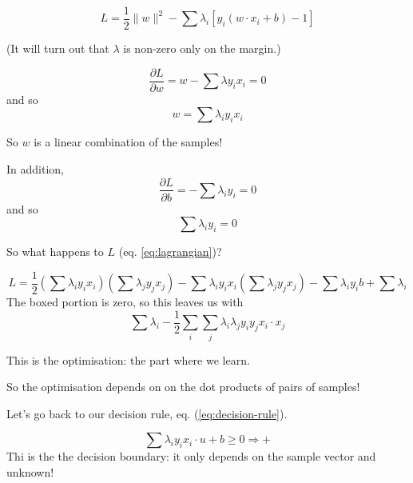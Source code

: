\begin{equation}
  \label{eq:lagrangian}
  L = \frac 12 \parallel w\parallel^2 - \sum \lambda_i \left[ y_i(w\cdot
    x_i + b) - 1 \right]
\end{equation}

(It will turn out that $\lambda$ is non-zero only on the margin.)

\begin{displaymath}
  \frac{\partial L}{\partial w} = w - \sum\lambda y_i x_i = 0
\end{displaymath}
and so
\begin{equation}
  \label{eq:w}
  w = \sum\lambda_i y_i x_i
\end{equation}

So $w$ is a linear combination of the samples!

In addition,
\begin{displaymath}
  \frac{\partial L}{\partial b} = -\sum \lambda_i y_i = 0
\end{displaymath}
and so
\begin{equation}
  \label{eq:b}
  \sum \lambda_i y_i = 0
\end{equation}

So what happens to $L$ (eq. \ref{eq:lagrangian})?

\bigskip

\begin{equation}
  \label{eq:learning-rule}
  L = \frac 12 \left( \sum \lambda_i y_i x_i\right)
  \left(\sum \lambda_j y_j x_j\right)
  -
  \sum \lambda_i y_i x_i
  \left(\sum \lambda_j y_j x_j\right)
  - \boxed{\sum \lambda_i y_i} b + \sum \lambda_i
\end{equation}
The boxed portion is zero, so this leaves us with
\begin{equation}
  \label{eq:recognition-rule}
  \sum\lambda_i - \frac 12 \sum_i \sum_j \lambda_i \lambda_j y_i y_j
  x_i\cdot x_j
\end{equation}

This is the optimisation: the part where we learn.

So the optimisation depends on on the dot products of pairs of
samples!

\bigskip

Let's go back to our decision rule, eq. (\ref{eq:decision-rule}).

\begin{displaymath}
  \sum \lambda_i y_i x_i\cdot u + b \ge 0 \Rightarrow +
\end{displaymath}
Thi is the the decision boundary: it only depends on the sample vector
and unknown!

